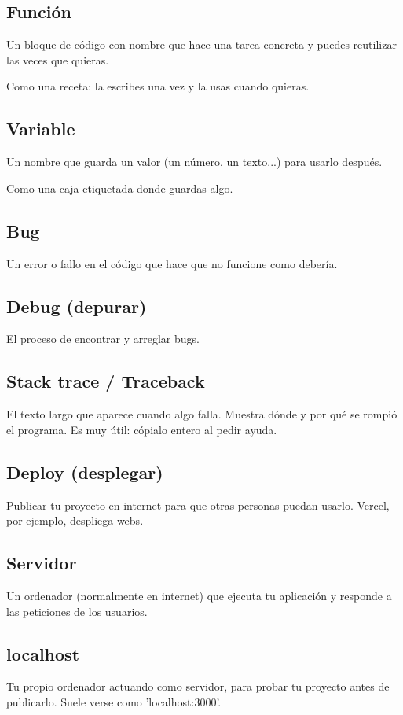 \documentclass[11pt,a4paper]{book}
\begin{document}
\subsection{Función}
Un bloque de código con nombre que hace una tarea concreta y puedes reutilizar las veces que quieras.

Como una receta: la escribes una vez y la usas cuando quieras.

\subsection{Variable}
Un nombre que guarda un valor (un número, un texto...) para usarlo después.

Como una caja etiquetada donde guardas algo.

\subsection{Bug}
Un error o fallo en el código que hace que no funcione como debería.

\subsection{Debug (depurar)}
El proceso de encontrar y arreglar bugs.

\subsection{Stack trace / Traceback}
El texto largo que aparece cuando algo falla. Muestra dónde y por qué se rompió el programa. Es muy útil: cópialo entero al pedir ayuda.

\subsection{Deploy (desplegar)}
Publicar tu proyecto en internet para que otras personas puedan usarlo. Vercel, por ejemplo, despliega webs.

\subsection{Servidor}
Un ordenador (normalmente en internet) que ejecuta tu aplicación y responde a las peticiones de los usuarios.

\subsection{localhost}
Tu propio ordenador actuando como servidor, para probar tu proyecto antes de publicarlo. Suele verse como 'localhost:3000'.
\end{document}
